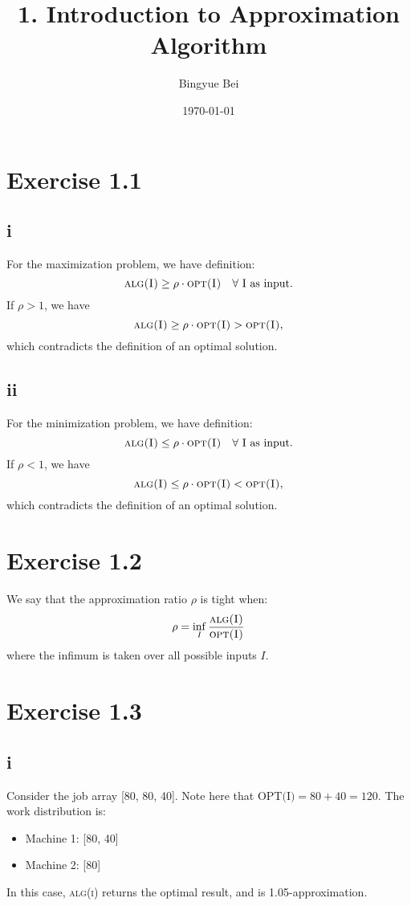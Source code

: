 \documentclass[11pt]{article}
\begin{document}
\title{1. Introduction to Approximation Algorithm}
\author{Bingyue Bei}
\date{\today}
\maketitle

\section*{Exercise 1.1}
\subsection*{i} \noindent
For the maximization problem, we have definition: 
\[
\textsc{alg(I)} \geq \rho \cdot \textsc{opt(I)} \quad \forall \text { I} \text{ as input.}
\]
If $\rho > 1$, we have
\[
\textsc{alg(I)} \geq \rho \cdot \textsc{opt(I)} > \textsc{opt(I)},
\]
which contradicts the definition of an optimal solution.
\subsection*{ii} \noindent
For the minimization problem, we have definition: 
\[
\textsc{alg(I)} \leq \rho \cdot \textsc{opt(I)} \quad \forall \text { I} \text{ as input.}
\]
If $\rho < 1$, we have
\[
\textsc{alg(I)} \leq \rho \cdot \textsc{opt(I)} < \textsc{opt(I)},
\]
which contradicts the definition of an optimal solution.

\section*{Exercise 1.2}
We say that the approximation ratio $\rho$ is tight when:
\[
\rho = \inf_{I} \frac{\textsc{alg(I)}}{\textsc{opt(I)}}
\]
where the infimum is taken over all possible inputs $I$.

\section*{Exercise 1.3}
\subsection*{i} \noindent
Consider the job array [80, 80, 40]. Note here that $\text{OPT(I)} = 80 + 40 = 120$.  
The work distribution is:
\begin{itemize}
    \item Machine 1: [80, 40]
    \item Machine 2: [80]
\end{itemize}
In this case, \textsc{alg(i)} returns the optimal result,
and is 1.05-approximation.
\end{document}
